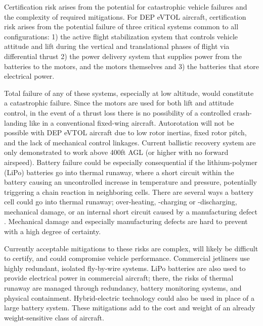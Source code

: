 \documentclass[]{aiaa-tc}%
\begin{document}
Certification risk arises from the potential for catastrophic vehicle failures and the complexity of required mitigations.  For DEP eVTOL aircraft, certification risk arises from the potential failure of three critical systems common to all configurations:  1) the active flight stabilization system that controls vehicle attitude and lift during the vertical and translational phases of flight via differential thrust 2) the power delivery system that supplies power from the batteries to the motors, and the motors themselves and 3) the batteries that store electrical power. 

Total failure of any of these systems, especially at low altitude, would constitute a catastrophic failure.  Since the motors are used for both lift and attitude control, in the event of a thrust loss there is no possibility of a controlled crash-landing like in a conventional fixed-wing aircraft. Autorotation will not be possible with DEP eVTOL aircraft due to low rotor inertias, fixed rotor pitch, and the lack of mechanical control linkages. Current ballistic recovery system are only demonstrated to work above 400ft AGL (or higher with no forward airspeed)\cite{CAPS}.  Battery failure could be especially consequential if the lithium-polymer (LiPo) batteries go into thermal runaway, where a short circuit within the battery causing an uncontrolled increase in temperature and pressure, potentially triggering a chain reaction in neighboring cells.  There are several ways a battery cell could go into thermal runaway; over-heating, -charging or -discharging, mechanical damage, or an internal short circuit caused by a manufacturing defect \cite{Doughty2012}.  Mechanical damage and especially manufacturing defects are hard to prevent with a high degree of certainty.

Currently acceptable mitigations to these risks are complex, will likely be difficult to certify, and could compromise vehicle performance. Commercial jetliners use highly redundant, isolated fly-by-wire systems.  LiPo batteries are also used to provide electrical power in commercial aircraft; there, the risks of thermal runaway are managed through redundancy, battery monitoring systems, and physical containment\cite{NYT_bat}. Hybrid-electric technology could also be used in place of a large battery system.  These mitigations add to the cost and weight of an already weight-sensitive class of aircraft.  
\end{document}
